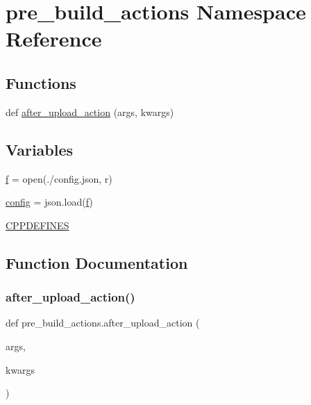 \hypertarget{namespacepre__build__actions}{}\section{pre\+\_\+build\+\_\+actions Namespace Reference}
\label{namespacepre__build__actions}
\subsection*{Functions}
\begin{DoxyCompactItemize}
\item 
def \hyperlink{namespacepre__build__actions_ad170ea3bcfc9770de7ae33943d181a4f}{after\+\_\+upload\+\_\+action} (args, kwargs)
\end{DoxyCompactItemize}
\subsection*{Variables}
\begin{DoxyCompactItemize}
\item 
\hyperlink{namespacepre__build__actions_af762757a92c7b9627973e0d434c58115}{f} = open(\textquotesingle{}./config.\+json\textquotesingle{}, \textquotesingle{}r\textquotesingle{})
\item 
\hyperlink{namespacepre__build__actions_ad21480457dbfecc6160a8ea8cdde2bbd}{config} = json.\+load(\hyperlink{namespacepre__build__actions_af762757a92c7b9627973e0d434c58115}{f})
\item 
\hyperlink{namespacepre__build__actions_af276cd5a6479d0d283ca21e90df104b9}{C\+P\+P\+D\+E\+F\+I\+N\+ES}
\end{DoxyCompactItemize}


\subsection{Function Documentation}
\mbox{\label{namespacepre__build__actions_ad170ea3bcfc9770de7ae33943d181a4f}} 
\subsubsection{\texorpdfstring{after\+\_\+upload\+\_\+action()}{after\_upload\_action()}}
{\footnotesize\ttfamily def pre\+\_\+build\+\_\+actions.\+after\+\_\+upload\+\_\+action (\begin{DoxyParamCaption}\item[{}]{args,  }\item[{}]{kwargs }\end{DoxyParamCaption})}



